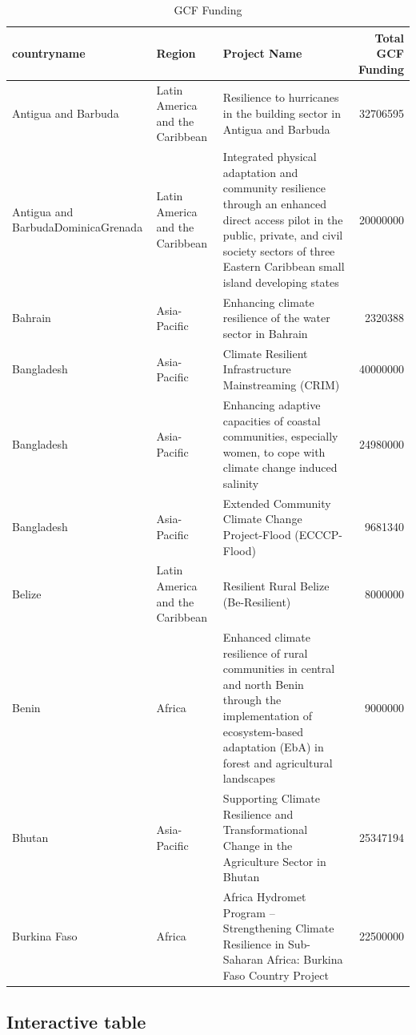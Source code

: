 \documentclass[
]{book}
\begin{document}
\begin{table}

\caption{\label{tab:unnamed-chunk-8}GCF Funding}
\centering
\fontsize{10}{12}\selectfont
\begin{tabular}[t]{l|l|l|r}
\hline
countryname & Region & Project Name & Total GCF Funding\\
\hline
Antigua and Barbuda & Latin America and the Caribbean & Resilience to hurricanes in the building sector in Antigua and Barbuda & 32706595\\
\hline
Antigua and BarbudaDominicaGrenada & Latin America and the Caribbean & Integrated physical adaptation and community resilience through an enhanced direct access pilot in the public, private, and civil society sectors of three Eastern Caribbean small island developing states & 20000000\\
\hline
Bahrain & Asia-Pacific & Enhancing climate resilience of the water sector in Bahrain & 2320388\\
\hline
Bangladesh & Asia-Pacific & Climate Resilient Infrastructure Mainstreaming (CRIM) & 40000000\\
\hline
Bangladesh & Asia-Pacific & Enhancing adaptive capacities of coastal communities, especially women, to cope with climate change induced salinity & 24980000\\
\hline
Bangladesh & Asia-Pacific & Extended Community Climate Change Project-Flood (ECCCP-Flood) & 9681340\\
\hline
Belize & Latin America and the Caribbean & Resilient Rural Belize (Be-Resilient) & 8000000\\
\hline
Benin & Africa & Enhanced climate resilience of rural communities in central and north Benin through the implementation of ecosystem-based adaptation (EbA) in forest and agricultural landscapes & 9000000\\
\hline
Bhutan & Asia-Pacific & Supporting Climate Resilience and Transformational Change in the Agriculture Sector in Bhutan & 25347194\\
\hline
Burkina Faso & Africa & Africa Hydromet Program – Strengthening Climate Resilience in Sub-Saharan Africa: Burkina Faso Country Project & 22500000\\
\hline
\end{tabular}
\end{table}

\hypertarget{interactive-table}{%
\subsection{Interactive table}\label{interactive-table}}
\end{document}
